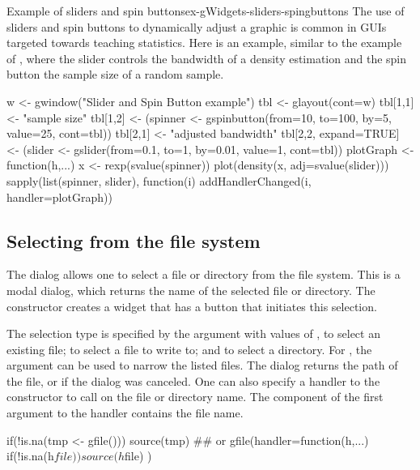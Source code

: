 \begin{example}{Example of sliders and spin buttons}{ex-gWidgets-sliders-spingbuttons}
  The use of sliders and spin buttons to dynamically adjust a graphic
  is common in \R\/ GUIs targeted towards teaching statistics. Here is
  an example, similar to the  example of ,
  where the slider controls the bandwidth of a density estimation and
  the spin button the sample size of a random sample.
\begin{Schunk}
\begin{Sinput}
 w <- gwindow("Slider and Spin Button example") 
 tbl <- glayout(cont=w)
 tbl[1,1] <- "sample size"
 tbl[1,2] <- (spinner <- gspinbutton(from=10, to=100, by=5, 
                                     value=25, cont=tbl))
 tbl[2,1] <- "adjusted bandwidth"
 tbl[2,2, expand=TRUE] <- (slider <- gslider(from=0.1, to=1, 
            by=0.01, value=1, cont=tbl))
 plotGraph <- function(h,...) {
   x <- rexp(svalue(spinner))
   plot(density(x, adj=svalue(slider)))
 }
 sapply(list(spinner, slider), function(i) 
   addHandlerChanged(i, handler=plotGraph))
\end{Sinput}
\end{Schunk}
\end{example}




\subsection{Selecting from the file system}
\label{sec:gWidgets-selecting-from-file}

The  dialog allows one to select a file or directory
from the file system. This is a modal dialog, which returns the name
of the selected file or directory. The 
constructor creates a widget that has a button that
initiates this selection.  

The selection type is specified by the  argument with
values of , to select an existing file;  to
select a file to write to; and  to select a
directory. For , the  argument can
be used to narrow the listed files. The dialog returns the path of the
file, or  if the dialog was canceled. One can also specify a
handler to the constructor to call on the file or directory name. The
component  of the first argument to the handler contains
the file name.

\begin{Schunk}
\begin{Sinput}
 if(!is.na(tmp <- gfile())) 
   source(tmp)
 ## or
 gfile(handler=function(h,...) {
   if(!is.na(h$file))
     source(h$file) 
 })   
\end{Sinput}
\end{Schunk}


